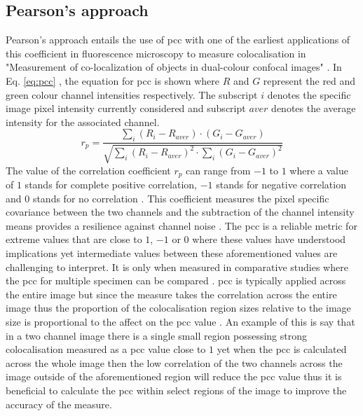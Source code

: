 \subsection{Pearson's approach}\label{sec:pcc}
Pearson's approach entails the use of \gls{pcc} with one of the earliest applications of this coefficient in fluorescence microscopy to measure colocalisation in "Measurement of co-localization of objects in dual-colour confocal images" \cite{Manders}. In Eq. \ref{eq:pcc} \cite[p. 376]{Manders}, the equation for \gls{pcc} is shown where $R$ and $G$ represent the red and green colour channel intensities respectively. The subscript $i$ denotes the specific image pixel intensity currently considered and subscript $aver$ denotes the average intensity for the associated channel. 
\begin{equation}\label{eq:pcc}
    r_p = \frac{\sum_i (R_i-R_{aver})\cdot (G_i-G_{aver})}{\sqrt{\sum_i (R_i-R_{aver})^2\cdot\sum_i(G_i-G_{aver})^2}}
\end{equation}
The value of the correlation coefficient $r_p$ can range from $-1$ to $1$ where a value of $1$ stands for complete positive correlation, $-1$ stands for negative correlation and $0$ stands for no correlation \cite{Bolte-2006}. This coefficient measures the pixel specific covariance between the two channels and the subtraction of the channel intensity means provides a resilience against channel noise \cite{practical_guide_coloc}. The \gls{pcc} is a reliable metric for extreme values that are close to $1$, $-1$ or $0$ where these values have understood implications yet intermediate values between these aforementioned values are challenging to interpret. It is only when measured in comparative studies where the \gls{pcc} for multiple specimen can be compared \cite{practical_guide_coloc}. \gls{pcc} is typically applied across the entire image but since the measure takes the correlation across the entire image thus the proportion of the colocalisation region sizes relative to the image size is proportional to the affect on the \gls{pcc} value \cite{practical_guide_coloc}. An example of this is say that in a two channel image there is a single small region possessing strong colocalisation measured as a \gls{pcc} value close to $1$ yet when the \gls{pcc} is calculated across the whole image then the low correlation of the two channels across the image outside of the aforementioned region will reduce the \gls{pcc} value thus it is beneficial to calculate the \gls{pcc} within select regions of the image to improve the accuracy of the measure.

